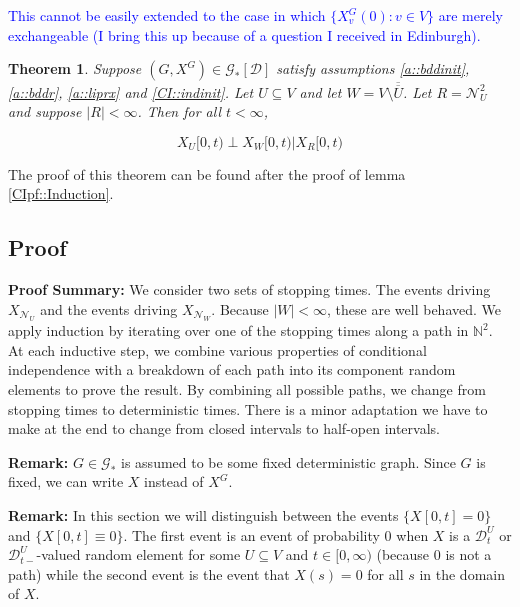 \documentclass[12pt]{article}
\newcommand{\skipLine}{\vspace{12pt}}
\newcommand{\mb}{\mathbb}
\newcommand{\mc}{\mathcal}
\newcommand{\ov}{\overline}
\newcommand{\tb}{\textcolor{blue}}
\newcommand{\pfsum}{\textbf{Proof Summary: }}
\newcommand{\remark}{\textbf{Remark: }}
\newcommand{\cad}{\mc{D}}							%
\newcommand{\neigh}[1]{\mc{N}_{#1}}					%
\newcommand{\dneigh}[1]{\mc{N}^2_{#1}}				%
\newcommand{\Xf}{X}									%
\newcommand{\vind}[1]{_{#1}}						%
\newcommand{\tme}[1]{(#1)}							%
\newcommand{\tmi}[1]{#1}							%
\newcommand{\gind}[1]{^{#1}}						%
\newcommand{\vpara}[1]{^{#1}}						%
\newcommand{\tpara}[1]{_{#1}}						%
\newcommand{\Gs}{\mc{G}_\ast}						%
\renewcommand{\sp}[1]{[#1]}							%
\newcommand{\seto}{U}								%
\newcommand{\sett}{W}								%
\newcommand{\setc}{R}								%
\newtheorem{thms}{Theorem}[section]
\begin{document}
\tb{This cannot be easily extended to the case in which \(\{X\gind{G}\vind{v}\tme{0}:v \in V\}\) are merely exchangeable (I bring this up because of a question I received in Edinburgh).}

\begin{thms}
Suppose \((G,\Xf\gind{G})\in \Gs\sp{\cad}\) satisfy assumptions \ref{a::bddinit},\ref{a::bddr}, \ref{a::liprx} and \ref{CI::indinit}. Let \(\seto \subseteq V\) and let \(\sett = V\setminus \ov{\ov{\seto}}\). Let \(\setc = \dneigh{\seto}\) and suppose \(|\setc| < \infty\). Then for all \(t < \infty\),

\begin{equation}
\Xf\vind{\seto}\tmi{[0,t)}\perp \Xf\vind{\sett}\tmi{[0,t)}|\Xf\vind{\setc}\tmi{[0,t)}
\label{CI::CIeqn}
\end{equation}

\label{CI::CI}
\end{thms}

The proof of this theorem can be found after the proof of lemma \ref{CIpf::Induction}.

\subsection{Proof}
\label{CI::CIpf}

\pfsum We consider two sets of stopping times. The events driving \(\Xf\vind{\neigh{\seto}}\) and the events driving \(\Xf\vind{\neigh{\sett}}\). Because \(|\sett| < \infty\), these are well behaved. We apply induction by iterating over one of the stopping times along a path in \(\mb{N}^2\). At each inductive step, we combine various properties of conditional independence with a breakdown of each path into its component random elements to prove the result. By combining all possible paths, we change from stopping times to deterministic times. There is a minor adaptation we have to make at the end to change from closed intervals to half-open intervals.

\skipLine

\remark \(G\in \Gs\) is assumed to be some fixed deterministic graph. Since \(G\) is fixed, we can write \(\Xf\) instead of \(\Xf\gind{G}\).

\skipLine

\remark In this section we will distinguish between the events \(\{\Xf\tmi{[0,t]} = 0\}\) and \(\{\Xf\tmi{[0,t]}\equiv 0\}\). The first event is an event of probability 0 when \(\Xf\) is a \(\cad\vpara{\seto}\tpara{t}\) or \(\cad\vpara{\seto}\tpara{t-}\)-valued random element for some \(\seto\subseteq V\) and \(t \in [0,\infty)\) (because 0 is not a path) while the second event is the event that \(\Xf\tme{s} = 0\) for all \(s\) in the domain of \(\Xf\).
\end{document}
